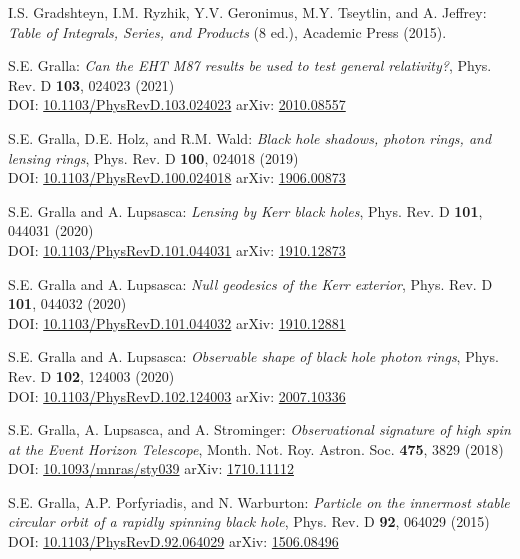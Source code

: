 \begin{thebibliography}{123}
I.S. Gradshteyn, I.M. Ryzhik, Y.V. Geronimus, M.Y. Tseytlin, and A. Jeffrey:
{\em  Table of Integrals, Series, and Products} (8 ed.),
Academic Press (2015).

S.E. Gralla:
{\em Can the EHT M87 results be used to test general relativity?},
Phys. Rev. D {\bf 103}, 024023 (2021)\\
DOI: \href{https://doi.org/10.1103/PhysRevD.103.024023}{10.1103/PhysRevD.103.024023}\hfill
arXiv: \href{https://arxiv.org/abs/2010.08557}{2010.08557}

S.E. Gralla, D.E. Holz, and R.M. Wald:
{\em Black hole shadows, photon rings, and lensing rings},
Phys. Rev. D {\bf 100}, 024018 (2019)\\
DOI: \href{https://doi.org/10.1103/PhysRevD.100.024018}{10.1103/PhysRevD.100.024018}\hfill
arXiv: \href{https://arxiv.org/abs/1906.00873}{1906.00873}

S.E. Gralla and A. Lupsasca:
{\em Lensing by Kerr black holes},
Phys. Rev. D {\bf 101}, 044031 (2020)\\
DOI: \href{https://doi.org/10.1103/PhysRevD.101.044031}{10.1103/PhysRevD.101.044031}\hfill
arXiv: \href{https://arxiv.org/abs/1910.12873}{1910.12873}

S.E. Gralla and A. Lupsasca:
{\em Null geodesics of the Kerr exterior},
Phys. Rev. D {\bf 101}, 044032 (2020)\\
DOI: \href{https://doi.org/10.1103/PhysRevD.101.044032}{10.1103/PhysRevD.101.044032}\hfill
arXiv: \href{https://arxiv.org/abs/1910.12881}{1910.12881}

S.E. Gralla and A. Lupsasca:
{\em Observable shape of black hole photon rings},
Phys. Rev. D {\bf 102}, 124003 (2020)\\
DOI: \href{https://doi.org/10.1103/PhysRevD.102.124003}{10.1103/PhysRevD.102.124003}\hfill
arXiv: \href{https://arxiv.org/abs/2007.10336}{2007.10336}

S.E. Gralla, A. Lupsasca, and A. Strominger:
{\em Observational signature of high spin at the Event Horizon Telescope},
Month. Not. Roy. Astron. Soc. {\bf 475}, 3829 (2018)\\
DOI: \href{https://doi.org/10.1093/mnras/sty039}{10.1093/mnras/sty039}\hfill
arXiv: \href{https://arxiv.org/abs/1710.11112}{1710.11112}

S.E. Gralla, A.P. Porfyriadis, and N. Warburton:
{\em Particle on the innermost stable circular orbit of a rapidly spinning black hole},
Phys. Rev. D {\bf 92}, 064029 (2015)\\
DOI: \href{https://doi.org/10.1103/PhysRevD.92.064029}{10.1103/PhysRevD.92.064029}\hfill
arXiv: \href{https://arxiv.org/abs/1506.08496}{1506.08496}


\end{thebibliography}

